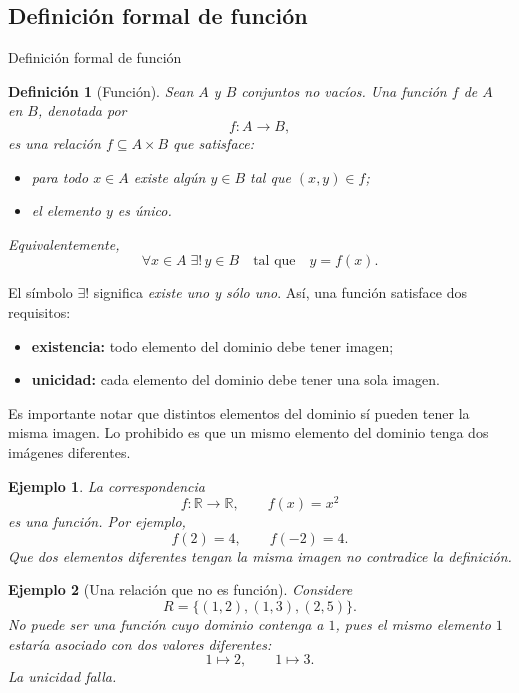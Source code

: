 \documentclass[aspectratio=169,10pt]{beamer}
\newtheorem{definicion}{Definición}
\newtheorem{ejemplo}{Ejemplo}
\newcommand{\R}{\mathbb{R}}
\begin{document}
\subsection{Definición formal de función}
\begin{frame}{Definición formal de función}

\begin{definicion}[Función]
Sean $A$ y $B$ conjuntos no vacíos. Una \emph{función} $f$ de $A$ en $B$,
denotada por
\[
f:A\longrightarrow B,
\]
es una relación $f\subseteq A\times B$ que satisface:

\begin{itemize}
    \item para todo $x\in A$ existe algún $y\in B$ tal que $(x,y)\in f$;
    \item el elemento $y$ es único.
\end{itemize}

Equivalentemente,
\[
\forall x\in A\;\exists!\,y\in B
\quad\text{tal que}\quad y=f(x).
\]
\end{definicion}

El símbolo $\exists!$ significa \textit{existe uno y sólo uno}. Así, una función satisface dos requisitos:

\begin{itemize}
    \item \textbf{existencia:} todo elemento del dominio debe tener imagen;
    \item \textbf{unicidad:} cada elemento del dominio debe tener una sola imagen.
\end{itemize}

Es importante notar que distintos elementos del dominio sí pueden tener la misma imagen. Lo prohibido es que un mismo elemento del dominio tenga dos imágenes diferentes.

\begin{ejemplo}
La correspondencia
\[
f:\R\to\R,\qquad f(x)=x^2
\]
es una función. Por ejemplo,
\[
f(2)=4,\qquad f(-2)=4.
\]
Que dos elementos diferentes tengan la misma imagen no contradice la
definición.
\end{ejemplo}

\begin{ejemplo}[Una relación que no es función]
Considere
\[
R=\{(1,2),(1,3),(2,5)\}.
\]
No puede ser una función cuyo dominio contenga a $1$, pues el mismo elemento $1$ estaría asociado con dos valores diferentes:
\[
1\mapsto2,\qquad 1\mapsto3.
\]
La unicidad falla.
\end{ejemplo}

\end{frame}
\end{document}
